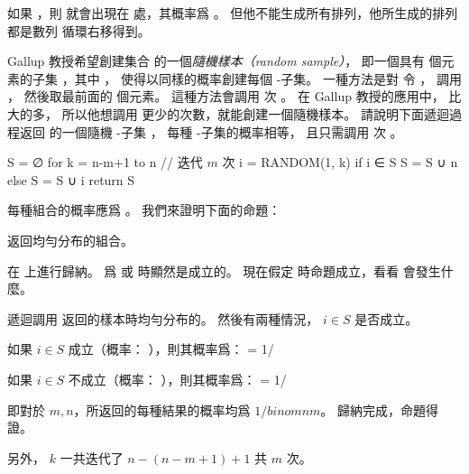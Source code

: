 \startANSWER
如果 ，則  就會出現在  處，其概率爲 。
但他不能生成所有排列，他所生成的排列都是數列  循環右移得到。
\stopANSWER

\startEXERCISE
Gallup 教授希望創建集合  的一個\emph{隨機樣本（random sample）}，
即一個具有  個元素的子集 ，其中 ，
使得以同樣的概率創建每個 -子集。
一種方法是對  令 ，
調用 ，
然後取最前面的  個元素。
這種方法會調用  次 。
在 Gallup 教授的應用中，  比  大的多，
所以他想調用  更少的次數，就能創建一個隨機樣本。
請說明下面遞迴過程返回  的一個隨機 -子集 ，
每種 -子集的概率相等，
且只需調用  次 。

\startCLRSCODE
S = ∅
for k = n-m+1 to n	// 迭代 $m$ 次
	i = RANDOM(1, k)
	if i ∈ S
		S = S ∪ {n}
	else S = S ∪ {i}
	return S
\stopCLRSCODE
\stopEXERCISE

\startANSWER
每種組合的概率應爲 。
我們來證明下面的命題：

 返回均勻分布的組合。

在  上進行歸納。  爲  或  時顯然是成立的。
現在假定  時命題成立，看看  會發生什麼。

遞迴調用  返回的樣本時均勻分布的。
然後有兩種情況， $i ∈ S$ 是否成立。

如果 $i ∈ S$ 成立（概率： ），則其概率爲：
\startformula
{} = 1/
\stopformula

如果 $i ∈ S$ 不成立（概率： ），則其概率爲：
\startformula
{} = 1/
\stopformula

即對於 $m,n$，所返回的每種結果的概率均爲 $1/binom{n}{m}$。
歸納完成，命題得證。

另外， $k$ 一共迭代了 $n-(n-m+1) + 1$ 共 $m$ 次。
\stopANSWER

\stopsection
